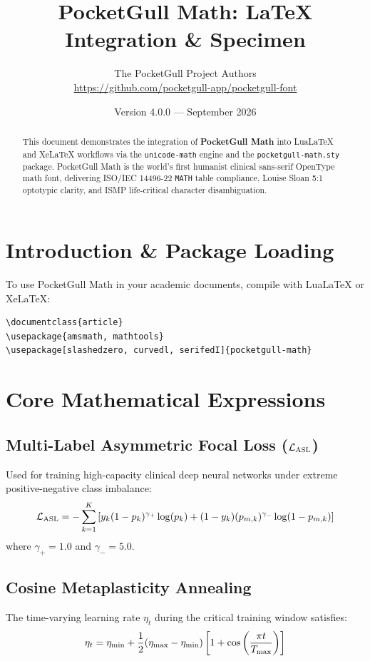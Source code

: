 \documentclass[11pt,a4paper]{article}
\title{\textbf{PocketGull Math: LaTeX Integration \& Specimen}}
\author{The PocketGull Project Authors \\ \url{https://github.com/pocketgull-app/pocketgull-font}}
\date{Version 4.0.0 --- September 2026}
\begin{document}
\maketitle

\begin{abstract}
This document demonstrates the integration of \textbf{PocketGull Math} into LuaLaTeX and XeLaTeX workflows via the \texttt{unicode-math} engine and the \texttt{pocketgull-math.sty} package. PocketGull Math is the world's first humanist clinical sans-serif OpenType math font, delivering ISO/IEC 14496-22 \texttt{MATH} table compliance, Louise Sloan 5:1 optotypic clarity, and ISMP life-critical character disambiguation.
\end{abstract}

\section{Introduction \& Package Loading}
To use PocketGull Math in your academic documents, compile with LuaLaTeX or XeLaTeX:
\begin{verbatim}
\documentclass{article}
\usepackage{amsmath, mathtools}
\usepackage[slashedzero, curvedl, serifedI]{pocketgull-math}
\end{verbatim}

\section{Core Mathematical Expressions}

\subsection{Multi-Label Asymmetric Focal Loss ($\mathcal{L}_{\mathrm{ASL}}$)}
Used for training high-capacity clinical deep neural networks under extreme positive-negative class imbalance:
\begin{equation}
\mathcal{L}_{\mathrm{ASL}} = - \sum_{k=1}^{K} \left[ y_k (1 - p_k)^{\gamma_+} \log(p_k) + (1 - y_k) (p_{m,k})^{\gamma_-} \log(1 - p_{m,k}) \right]
\end{equation}
where $\gamma_+ = 1.0$ and $\gamma_- = 5.0$.

\subsection{Cosine Metaplasticity Annealing}
The time-varying learning rate $\eta_t$ during the critical training window satisfies:
\begin{equation}
\eta_t = \eta_{\min} + \frac{1}{2}(\eta_{\max} - \eta_{\min}) \left[ 1 + \cos\left( \frac{\pi t}{T_{\max}} \right) \right]
\end{equation}
\end{document}
